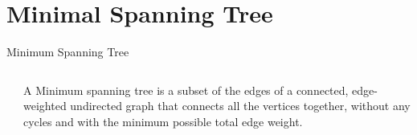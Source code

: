 \documentclass[10pt]{beamer}
\begin{document}
\section{Minimal Spanning Tree}

\begin{frame}{Minimum Spanning Tree}
\begin{columns}
		\begin{column}{0.4\textwidth} 
		\end{column}
		\begin{column}{0.6\textwidth}
			A \alert{Minimum spanning tree} is a subset of the edges of a connected,
			edge-weighted undirected graph that connects all the vertices together,
			without any cycles and with the minimum possible total edge weight.
		\end{column}
	\end{columns} 
\end{frame}
\end{document}
